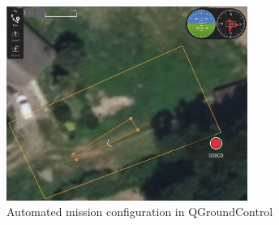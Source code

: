 \begin{figure}[!hbt]
  \centering
  \includegraphics[width=0.7\textwidth]{./img/png/mission-final} 
  \caption{Automated mission configuration in QGroundControl}%
  \label{fig:mission-final}
\end{figure}

